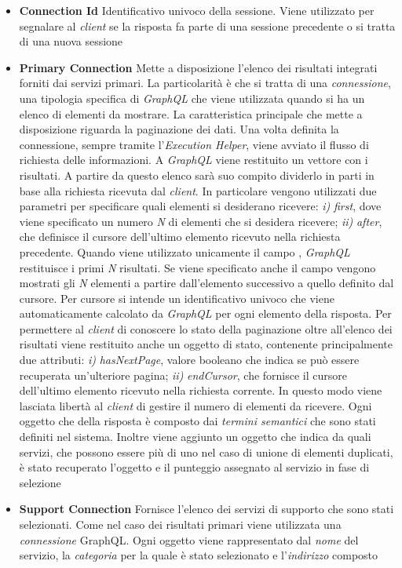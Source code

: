\begin{itemize}
	\item \textbf{Connection Id}
	Identificativo univoco della sessione. Viene utilizzato per segnalare al \emph{client} se la risposta fa parte di una sessione precedente o si tratta di una nuova sessione
	\item \textbf{Primary Connection}
	Mette a disposizione l'elenco dei risultati integrati forniti dai servizi primari. La particolarità è che si tratta di una \emph{connessione}, una tipologia specifica di \emph{GraphQL} che viene utilizzata quando si ha un elenco di elementi da mostrare. La caratteristica principale che mette a disposizione riguarda la paginazione dei dati. Una volta definita la connessione, sempre tramite l'\emph{Execution Helper}, viene avviato il flusso di richiesta delle informazioni. A \emph{GraphQL} viene restituito un vettore con i risultati. A partire da questo elenco sarà suo compito dividerlo in parti in base alla richiesta ricevuta dal \emph{client}. In particolare vengono utilizzati due parametri per specificare quali elementi si desiderano ricevere: \emph{i)} \emph{first}, dove viene specificato un numero \emph{N} di elementi che si desidera ricevere; \emph{ii)} \emph{after}, che definisce il cursore dell'ultimo elemento ricevuto nella richiesta precedente. Quando viene utilizzato unicamente il campo , \emph{GraphQL} restituisce i primi \emph{N} risultati. Se viene specificato anche il campo  vengono mostrati gli \emph{N} elementi a partire dall'elemento successivo a quello definito dal cursore. Per cursore si intende un identificativo univoco che viene automaticamente calcolato da \emph{GraphQL} per ogni elemento della risposta. Per permettere al \emph{client} di conoscere lo stato della paginazione oltre all'elenco dei risultati viene restituito anche un oggetto di stato, contenente principalmente due attributi: \emph{i)} \emph{hasNextPage}, valore booleano che indica se può essere recuperata un'ulteriore pagina; \emph{ii)} \emph{endCursor}, che fornisce il cursore dell'ultimo elemento ricevuto nella richiesta corrente. In questo modo viene lasciata libertà al \emph{client} di gestire il numero di elementi da ricevere. Ogni oggetto che della risposta è composto dai \emph{termini semantici} che sono stati definiti nel sistema. Inoltre viene aggiunto un oggetto che indica da quali servizi, che possono essere più di uno nel caso di unione di elementi duplicati, è stato recuperato l'oggetto e il punteggio assegnato al servizio in fase di selezione
	\item \textbf{Support Connection}
	Fornisce l'elenco dei servizi di supporto che sono stati selezionati. Come nel caso dei risultati primari viene utilizzata una \emph{connessione} GraphQL. Ogni oggetto viene rappresentato dal \emph{nome} del servizio, la \emph{categoria} per la quale è stato selezionato e l'\emph{indirizzo} composto
\end{itemize}

